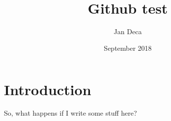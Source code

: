 \documentclass{article}
\title{Github test}
\author{Jan Deca}
\date{September 2018}
\begin{document}
\maketitle

\section{Introduction}

So, what happens if I write some stuff here?
\end{document}
